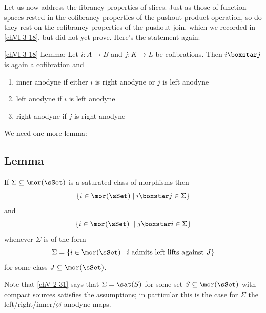         Let us now address the fibrancy properties of slices. Just as those of function spaces rested in the cofibrancy properties of the pushout-product operation, so do they rest on the cofibrancy properties of the pushout-join, which we recorded in \ref{chVI-3-18}, but did not yet prove. Here's the statement again:
        \medskip

        \ref{chVI-3-18} Lemma:
        Let $i \colon A \to B$ and $j \colon K \to L$ be cofibrations. Then $i \boxstar j$ is again a cofibration and
        \begin{enumerate}[label=\roman*)]
            \item[ii)-iii)]\addtocounter{enumi}{3}
                inner anodyne if either $i$ is right anodyne or $j$ is left anodyne
            \item
                left anodyne if $i$ is left anodyne
            \item
                right anodyne if $j$ is right anodyne
        \end{enumerate}
        \medskip

        We need one more lemma:

    \subsection{Lemma}\label{chVI-3-41}
        If $\Sigma \subseteq \mor (\sSet)$ is a saturated class of morphisms then
        \begin{equation*}
            \{ i \in \mor (\sSet) \mid i \boxstar j \in \Sigma \}
        \end{equation*}
        and
        \begin{equation*}
            \{ i \in \mor (\sSet)\ \mid j \boxstar i \in \Sigma \}
        \end{equation*}
        whenever $\Sigma$ is of the form
        \begin{equation*}
            \Sigma = \{ i \in \mor (\sSet) \mid i \text{ admits left lifts against } J \}
        \end{equation*}
        for some class $J \subseteq \mor (\sSet)$.
        \smallskip

        Note that \ref{chV-2-31} says that $\Sigma = \sat (S)$ for some set $S \subseteq \mor (\sSet)$ with compact sources satisfies the assumptions; in particular this is the case for $\Sigma$ the left/right/inner/$\varnothing$ anodyne maps.

